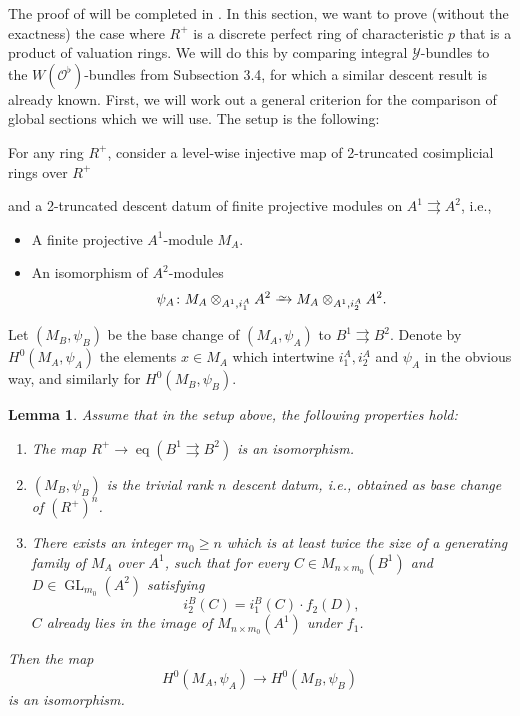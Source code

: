 \documentclass[10pt,twoside]{article}
\numberwithin{equation}{section}
\newcommand\isom{
	\xrightarrow{\smash{\raisebox{-0.65ex}{\ensuremath{\scriptstyle\sim}}}}
}
\theoremstyle{plain}
\newtheorem{mylemma}[mythm]{Lemma}
\theoremstyle{definition}
\DeclareMathOperator{\id}{id}
\DeclareMathOperator{\GL}{GL}
\newcommand{\MCO}{\mathcal{O}}
\newcommand{\MCY}{\mathcal{Y}}
\DeclareMathOperator{\eq}{eq}
\begin{document}
The proof of  will be completed in . In this section, we want to prove (without the exactness) the case where \(R^+\) is a discrete perfect ring of characteristic \(p\) that is a product of valuation rings. We will do this by comparing integral \(\MCY\)-bundles to the \(W(\MCO^\flat)\)-bundles from Subsection 3.4, for which a similar descent result is already known. First, we will work out a general criterion for the comparison of global sections which we will use. The setup is the following:\par
For any ring \(R^+\), consider a level-wise injective map of 2-truncated cosimplicial rings over \(R^+\)
\begin{center}
\end{center}
and a 2-truncated descent datum of finite projective modules on \(A^1\rightrightarrows A^2\), i.e.,
\begin{itemize}
    \item A finite projective \(A^1\)-module \(M_A\).
    \item An isomorphism of \(A^2\)-modules
    \[\psi_{A}\colon M_A\otimes_{A^1, i_1^A} A^2\isom M_A\otimes_{A^1, i_2^A}A^2.\]
\end{itemize}
Let \((M_B, \psi_{B})\) be the base change of \((M_A, \psi_{A})\) to \(B^1\rightrightarrows B^2\). Denote by \(H^0(M_A,\psi_A)\) the elements \(x\in M_A\) which intertwine \(i_1^A, i_2^A\) and \(\psi_A\) in the obvious way, and similarly for \(H^0(M_B,\psi_B)\).






\begin{mylemma}\label{caseILemmaGeneralStatement}
Assume that in the setup above, the following properties hold: 

\begin{enumerate}
    \item The map \(R^+\to \eq(B^1\rightrightarrows B^2)\) is an isomorphism.
    \item \((M_B,\psi_B)\) is the trivial rank \(n\) descent datum, i.e., obtained as base change of \((R^+)^n\).
    \item There exists an integer \(m_0\geq n\) which is at least twice the size of a generating family of \(M_A\) over \(A^1\), such that for every \(C\in M_{n\times m_0}(B^1)\) and \(D\in\GL_{m_0}(A^2)\) satisfying
        \[i_2^B(C)=i^B_1(C)\cdot f_2(D),\]
    \(C\) already lies in the image of \(M_{n\times m_0}(A^1)\) under \(f_1\).
\end{enumerate}
Then the map
\[H^0(M_A,\psi_A)\longrightarrow H^0(M_B,\psi_B)\]
is an isomorphism.
\end{mylemma}
\end{document}
